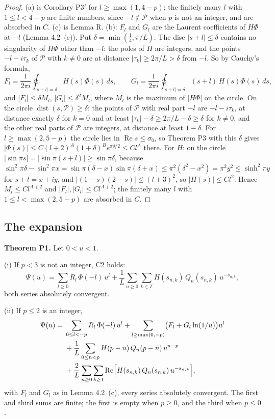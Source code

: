 \documentclass[11pt]{article}
\newcommand{\re}{\operatorname{Re}}
\newcommand{\dist}{\operatorname{dist}}
\begin{document}
\begin{proof}
(a) is Corollary P3$'$ for $l\ge\max(1,4-p)$; the finitely many $l$ with $1\le l<4-p$ are finite numbers, since $-l\notin\mathcal{P}$ when $p$ is not an integer, and are absorbed in $C$. (c) is Lemma R. (b): $F_l$ and $G_l$ are the Laurent coefficients of $H\Phi$ at $-l$ (Lemma 4.2~(c)). Put $\delta=\min(\frac14,\pi/L)$. The disc $|s+l|\le\delta$ contains no singularity of $H\Phi$ other than $-l$: the poles of $H$ are integers, and the points $-l-i\tau_k$ of $\mathcal{P}$ with $k\ne0$ are at distance $|\tau_k|\ge2\pi/L>\delta$ from $-l$. So by Cauchy's formula,
\[
F_l=\frac{1}{2\pi i}\oint_{|s+l|=\delta}H(s)\Phi(s)\,ds,\qquad G_l=\frac{1}{2\pi i}\oint_{|s+l|=\delta}(s+l)\,H(s)\Phi(s)\,ds,
\]
and $|F_l|\le\delta M_l$, $|G_l|\le\delta^2M_l$, where $M_l$ is the maximum of $|H\Phi|$ on the circle. On the circle $\dist(s,\mathcal{P})\ge\delta$: the points of $\mathcal{P}$ with real part $-l$ are $-l-i\tau_k$, at distance exactly $\delta$ for $k=0$ and at least $|\tau_k|-\delta\ge2\pi/L-\delta\ge\delta$ for $k\ne0$, and the other real parts of $\mathcal{P}$ are integers, at distance at least $1-\delta$. For $l\ge\max(2,5-p)$ the circle lies in $\re s\le\sigma_0$, so Theorem P3 with this $\delta$ gives $|\Phi(s)|\le C(l+2)^A(1+\delta)^Be^{\pi\delta/2}\le Cl^A$ there. For $H$: on the circle $|\sin\pi s|=|\sin\pi(s+l)|\ge\sin\pi\delta$, because $\sin^2\pi\delta-\sin^2\pi x=\sin\pi(\delta-x)\sin\pi(\delta+x)\le\pi^2(\delta^2-x^2)=\pi^2y^2\le\sinh^2\pi y$ for $s+l=x+iy$, and $|(1-s)(2-s)|\le(l+3)^2$, so $|H(s)|\le Cl^2$. Hence $M_l\le Cl^{A+2}$ and $|F_l|,|G_l|\le Cl^{A+2}$; the finitely many $l$ with $1\le l<\max(2,5-p)$ are absorbed in $C$.
\end{proof}

\subsection{The expansion}

\noindent\textbf{Theorem P1.} Let $0<u<1$.

(i) If $p<3$ is not an integer, C2 holds:
\[
\Psi(u)=\sum_{l\ge0}R_l\,\Phi(-l)\,u^l+\frac1L\sum_{n\ge0}\sum_{k\in\mathbb{Z}}H(s_{n,k})\,Q_n(s_{n,k})\,u^{-s_{n,k}},
\]
both series absolutely convergent.

(ii) If $p\le2$ is an integer,
\begin{align*}
\Psi(u)={}&\sum_{0\le l<-p}R_l\,\Phi(-l)\,u^l+\sum_{l\ge\max(0,-p)}\bigl(F_l+G_l\ln(1/u)\bigr)u^l\\
&+\frac1L\sum_{0\le n<p}H(p-n)\,Q_n(p-n)\,u^{n-p}\\
&+\frac2L\sum_{n\ge0}\sum_{k\ge1}\re\Bigl[H(s_{n,k})\,Q_n(s_{n,k})\,u^{-s_{n,k}}\Bigr],
\end{align*}
with $F_l$ and $G_l$ as in Lemma 4.2~(c), every series absolutely convergent. The first and third sums are finite; the first is empty when $p\ge0$, and the third when $p\le0$.
\end{document}
